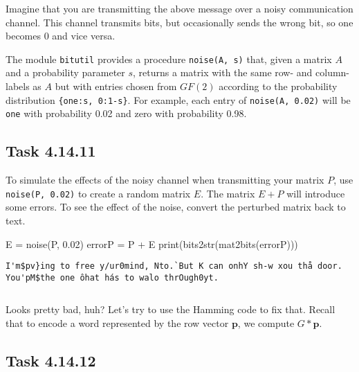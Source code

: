 \documentclass[
  letterpaper,
  DIV=11,
  numbers=noendperiod]{scrartcl}
\newenvironment{Shaded}{\begin{snugshade}}{\end{snugshade}}
\newcommand{\BuiltInTok}[1]{\textcolor[rgb]{0.00,0.23,0.31}{#1}}
\newcommand{\FloatTok}[1]{\textcolor[rgb]{0.68,0.00,0.00}{#1}}
\newcommand{\NormalTok}[1]{\textcolor[rgb]{0.00,0.23,0.31}{#1}}
\newcommand{\OperatorTok}[1]{\textcolor[rgb]{0.37,0.37,0.37}{#1}}
\begin{document}
\begin{lstlisting}
\end{lstlisting}

Imagine that you are transmitting the above message over a noisy
communication channel. This channel transmits bits, but occasionally
sends the wrong bit, so one becomes 0 and vice versa.

The module \texttt{bitutil} provides a procedure \texttt{noise(A,\ s)}
that, given a matrix \(A\) and a probability parameter \(s\), returns a
matrix with the same row- and column-labels as \(A\) but with entries
chosen from \(GF(2)\) according to the probability distribution
\texttt{\{one:s,\ 0:1-s\}}. For example, each entry of
\texttt{noise(A,\ 0.02)} will be \texttt{one} with probability 0.02 and
zero with probability 0.98.

\hypertarget{task-4.14.11}{%
\subsection{Task 4.14.11}\label{task-4.14.11}}

To simulate the effects of the noisy channel when transmitting your
matrix \(P\), use \texttt{noise(P,\ 0.02)} to create a random matrix
\(E\). The matrix \(E+P\) will introduce some errors. To see the effect
of the noise, convert the perturbed matrix back to text.

\begin{Shaded}
\begin{Highlighting}[numbers=left,,]
\NormalTok{E }\OperatorTok{=}\NormalTok{ noise(P, }\FloatTok{0.02}\NormalTok{)}
\NormalTok{errorP }\OperatorTok{=}\NormalTok{ P }\OperatorTok{+}\NormalTok{ E}
\BuiltInTok{print}\NormalTok{(bits2str(mat2bits(errorP)))}
\end{Highlighting}
\end{Shaded}

\begin{lstlisting}
I'm$pv}ing to free y/ur0mind, Nto.`But K can onhY sh-w xou thå door. You'pM$the one ôhat hás to walo thrOugh0yt.
\end{lstlisting}

\begin{lstlisting}
\end{lstlisting}

Looks pretty bad, huh? Let's try to use the Hamming code to fix that.
Recall that to encode a word represented by the row vector \(\bm{p}\),
we compute \(G*\bm{p}\).

\hypertarget{task-4.14.12}{%
\subsection{Task 4.14.12}\label{task-4.14.12}}
\end{document}

